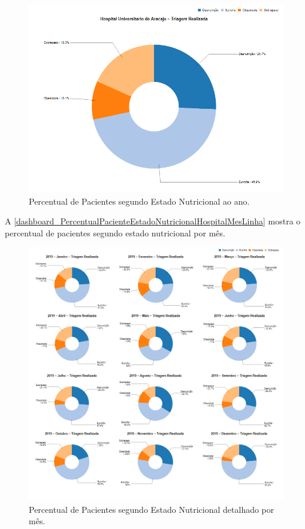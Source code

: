 \begin{figure}[htb]
	\caption{\label{dashboard_PercentualPacienteEstadoNutricionalHospitalAnoPizza}Percentual de Pacientes segundo Estado Nutricional ao ano.}
	\begin{center}
	    \includegraphics[scale=0.6]{Imagens/3.1.PercentualPacienteEstadoNutricionalHospitalAnoPizza.png}
	\end{center}
\end{figure}

\newpage
A \autoref{dashboard_PercentualPacienteEstadoNutricionalHospitalMesLinha} mostra o percentual de pacientes segundo estado nutricional por mês.

\begin{figure}[htb]
	\caption{\label{dashboard_PercentualPacienteEstadoNutricionalHospitalMesLinha}Percentual de Pacientes segundo Estado Nutricional detalhado por mês.}
	\begin{center}
	    \includegraphics[scale=0.6]{Imagens/3.2.PercentualPacienteEstadoNutricionalHospitalMesLinha.png}
	\end{center}
\end{figure}

